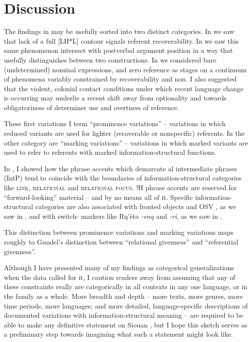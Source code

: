 \documentclass[output=paper]{LSP/langsci}
\begin{document}
\section{Discussion}\label{discussion}

The findings in  may be usefully sorted into two distinct categories. In  we saw that lack of a full [LH*L] contour signals referent recoverability. In  we saw this same phenomenon intersect with postverbal argument position in a way that usefully distinguishes between two constructions. In  we considered bare (undetermined) nominal expressions,  and zero reference as stages on a continuum of phenomena variably constrained by recoverability and non. I also suggested that the violent, colonial contact conditions under which recent language change is occurring may underlie a recent shift away from optionality and towards obligatoriness of determiner use and overtness of reference. 

These first variations I term “prominence variations” -- variations in which reduced variants are used for lighter (recoverable or nonspecific) referents. In the other category are “marking variations” -- variations in which marked variants are used to refer to referents with marked information-structural functions. 

In , I showed how the phrase accents which demarcate al intermediate phrases (IntP) tend to coincide with the boundaries of information-structural categories like \textsc{link, relational } and \textsc{relational focus}. !H phrase accents are reserved for “forward-looking” material -- and by no means all of it. Specific information-structural categories are also associated with fronted objects and OSV , as we saw in , and with switch- markers like Rų’éta \emph{-eną} and  \emph{-ri}, as we saw in .

This distinction between prominence variations and marking variations maps roughly to Gundel’s \citeyearpar{Gundel2003, Gundel1988} distinction between “relational givenness” and  “referential givenness”.

Although I have presented many of my findings as categorical generalizations when the data called for it, I caution readers away from assuming that any of these constraints really are categorically  in all contexts in any one language, or in the family as a whole. More breadth and depth -- more texts, more genres, more time periods, more languages; and more detailed, language-specific descriptions of documented variations with information-structural meaning -- are required to be able to make any definitive statement on Siouan , but I hope this sketch serves as a preliminary step towards imagining what such a statement might look like.
\end{document}
